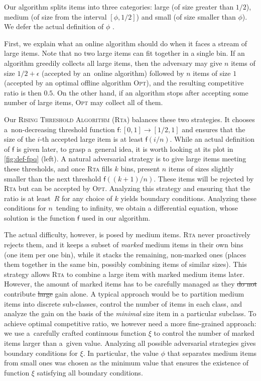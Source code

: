 \documentclass[a4paper,USenglish,cleveref]{lipics-v2019}
\newcommand{\R}{\ensuremath{R}}
\newcommand{\smallBoundary}{\ensuremath{\phi}}
\newcommand{\f}{\textsf{f}}
\newcommand{\g}{\ensuremath{\xi}}
\newcommand{\ALG}{\textsc{Rta}\xspace}
\newcommand{\OPT}{\textsc{Opt}\xspace}
\newcommand\maciek[1]{\texthl{#1}}
\begin{document}
Our algorithm splits items into three categories: large (of size greater than
$1/2$), medium (of size from the interval $[\smallBoundary, 1/2]$) and small (of size
smaller than $\smallBoundary$). We defer the actual definition of $\smallBoundary$ \maciek{and for now we note that it is approximately $0.21$}. 

First, we explain what an online algorithm should do when it faces a stream of
large items. Note that no two large items can fit together in a single bin. If
an algorithm greedily collects all large items, then the adversary may give $n$
items of size $1/2+\epsilon$ (accepted by an~online algorithm) followed by $n$
items of size $1$ (accepted by an optimal offline algorithm \OPT), and the 
resulting competitive ratio is then $0.5$. On the other
hand, if an algorithm stops after accepting some number of large items, 
\OPT may collect all of them. 

Our \textsc{Rising Threshold Algorithm} (\ALG) balances these two strategies. It
chooses a~non-decreasing threshold function $\f: [0,1] \to [1/2,1]$ and ensures
that the size of the $i$-th accepted large item is at least $\f(i/n)$. While an
actual definition of $\f$ is given later, to grasp a~general idea, it is worth
looking at its plot in \cref{fig:def-fpq} (left). A natural adversarial strategy
is to give large items meeting these thresholds, and once \ALG fills $k$ bins, \maciek{to}
present $n$ items of sizes slightly smaller than the next threshold
$\f((k+1)/n)$. These items will be rejected by \ALG but can be accepted by \OPT.
Analyzing this strategy and ensuring that the ratio is at least~$\R$ for any
choice of $k$ yields boundary conditions. Analyzing these conditions for 
$n$~tending to infinity, we obtain a differential equation, whose solution is the
function $\f$ used in our algorithm.

The actual difficulty, however, is posed by medium items. \ALG never proactively
rejects them, and it keeps a subset of \emph{marked} medium items in their own
bins (one item per one bin), while it stacks the remaining, non-marked ones
(places them together in the same bin, possibly combining items of similar
sizes). This strategy allows \ALG to combine a large item with marked medium
items later. However, the amount of marked items has to be carefully managed as
they \st{do not} contribute \st{large} \maciek{little} gain alone. A typical approach would be to
partition medium items into discrete sub-classes, control the number of items in
each class, and analyze the gain on the basis of the \emph{minimal} size item in
a particular subclass. To achieve optimal competitive ratio, we however need a
more fine-grained approach: we use a~carefully crafted continuous function $\g$
to control the number of marked items larger than a~given value. Analyzing all
possible adversarial strategies gives boundary conditions for $\g$. In
particular, the value $\smallBoundary$ that separates medium items from small
ones was chosen as the minimum value that ensures the existence of function $\g$
satisfying all boundary conditions.
\end{document}
